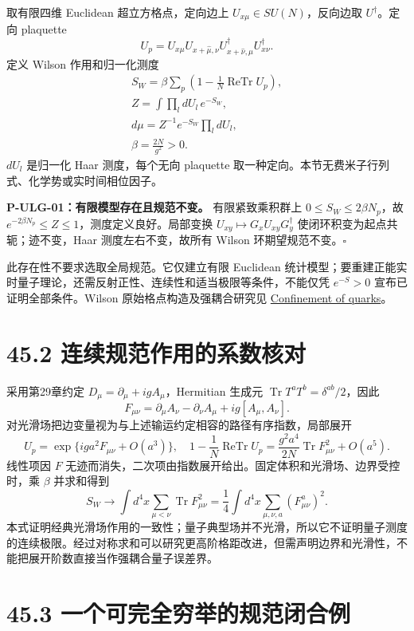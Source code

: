 \documentclass[
  11pt,
  oneside]{book}
\begin{document}
取有限四维 Euclidean 超立方格点，定向边上
\(U_{x\mu}\in SU(N)\)，反向边取 \(U^\dagger\)。定向 plaquette \[
U_p=U_{x\mu}U_{x+\hat\mu,\nu}U^\dagger_{x+\hat\nu,\mu}U^\dagger_{x\nu}.
\] 定义 Wilson 作用和归一化测度 \[
\begin{gathered}
S_W=\beta\sum_p\left(1-\frac1N\operatorname{ReTr}U_p\right),
\\ Z=\int\prod_l dU_l\,e^{-S_W},\\ d\mu=Z^{-1}e^{-S_W}\prod_l dU_l,
\\\beta=\frac{2N}{g^2}>0.
\end{gathered}
\] \(dU_l\) 是归一化 Haar 测度，每个无向 plaquette
取一种定向。本节无费米子行列式、化学势或实时间相位因子。

\protect\hypertarget{p-ulg-01}{}{}

\textbf{P-ULG-01：有限模型存在且规范不变。} 有限紧致乘积群上
\(0\le S_W\le2\beta N_p\)，故
\(e^{-2\beta N_p}\le Z\le1\)，测度定义良好。局部变换
\(U_{xy}\mapsto G_xU_{xy}G_y^\dagger\)
使闭环积变为起点共轭；迹不变，Haar 测度左右不变，故所有 Wilson
环期望规范不变。\(\square\)

此存在性不要求选取全局规范。它仅建立有限 Euclidean
统计模型；要重建正能实时量子理论，还需反射正性、连续性和适当极限等条件，不能仅凭
\(e^{-S}>0\) 宣布已证明全部条件。Wilson 原始格点构造及强耦合研究见
\href{https://link.aps.org/doi/10.1103/PhysRevD.10.2445}{Confinement of
quarks}。

\section{45.2 连续规范作用的系数核对}

采用第29章约定 \(D_\mu=\partial_\mu+igA_\mu\)，Hermitian 生成元
\(\operatorname{Tr}T^aT^b=\delta^{ab}/2\)，因此 \[
F_{\mu\nu}=\partial_\mu A_\nu-\partial_\nu A_\mu+ig[A_\mu,A_\nu].
\] 对光滑场把边变量视为与上述输运约定相容的路径有序指数，局部展开 \[
U_p=\exp\{iga^2F_{\mu\nu}+O(a^3)\},\quad
1-\frac1N\operatorname{ReTr}U_p
=\frac{g^2a^4}{2N}\operatorname{Tr}F_{\mu\nu}^2+O(a^5).
\] 线性项因 \(F\)
无迹而消失，二次项由指数展开给出。固定体积和光滑场、边界受控时，乘
\(\beta\) 并求和得到 \[
S_W\longrightarrow\int d^4x\sum_{\mu<\nu}\operatorname{Tr}F_{\mu\nu}^2
=\frac14\int d^4x\sum_{\mu,\nu,a}(F_{\mu\nu}^a)^2.
\]
本式证明经典光滑场作用的一致性；量子典型场并不光滑，所以它不证明量子测度的连续极限。经过对称求和可以研究更高阶格距改进，但需声明边界和光滑性，不能把展开阶数直接当作强耦合量子误差界。

\section{45.3 一个可完全穷举的规范闭合例}
\end{document}
